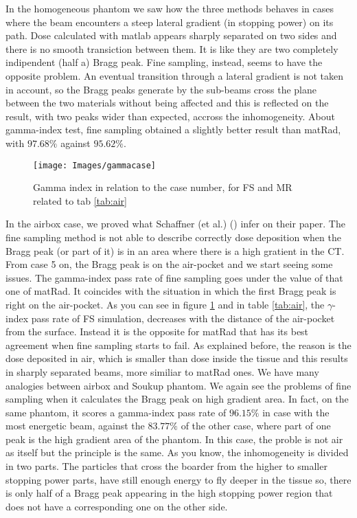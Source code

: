 \documentclass[12pt, a4paper, twoside]{book}
\begin{document}
In the homogeneous phantom we saw how the three methods behaves in cases where the beam encounters a steep lateral gradient (in stopping power) on its path. Dose calculated with matlab appears sharply separated on two sides and there is no smooth transiction between them. It is like they are two completely indipendent (half a) Bragg peak.
Fine sampling, instead, seems to have the opposite problem. An eventual transition through a lateral gradient is not taken in account, so the Bragg peaks generate by the sub-beams cross the plane between the two materials without being affected and this is reflected on the result, with two peaks wider than expected, accross the inhomogeneity. About gamma-index test, fine sampling obtained a slightly better result than matRad, with $97.68\%$ against $95.62\%$.

\begin{figure}[!t]
\centering
{\texttt{[image: Images/gammacase]}} 
\caption{Gamma index in relation to the case number, for FS and MR related to tab \ref{tab:air}}
\label{fig:gamcase}
\end{figure}

In the airbox case, we proved what Schaffner (et al.) (\cite{schaf:pba}) infer on their paper. The fine sampling method is not able to describe correctly dose deposition when the Bragg peak (or part of it) is in an area where there is a high gratient in the CT. From case 5 on, the Bragg peak is on the air-pocket and we start seeing some issues. The gamma-index pass rate of fine sampling goes under the value of that one of matRad. It coincides with the situation in which the first Bragg peak is right on the air-pocket. As you can see in figure \ref{fig:gamcase} and in table \ref{tab:air}, the $\gamma$-index pass rate of FS simulation, decreases with the distance of the air-pocket from the surface. Instead it is the opposite for matRad that has its best agreement when fine sampling starts to fail. As explained before, the reason is the dose deposited in air, which is smaller than dose inside the tissue and this results in sharply separated beams, more similiar to matRad ones. We have many analogies between airbox and Soukup phantom. We again see the problems of fine sampling when it calculates the Bragg peak on high gradient area. In fact, on the same phantom, it scores a gamma-index pass rate of $96.15\%$ in case with the most energetic beam, against the $83.77\%$ of the other case, where part of one peak is the high gradient area of the phantom. In this case, the proble is not air as itself but the principle is the same.
As you know, the inhomogeneity is divided in two parts. The particles that cross the boarder from the higher to smaller stopping power parts, have still enough energy to fly deeper in the tissue so, there is only half of a Bragg peak appearing in the high stopping power region that does not have a corresponding one on the other side.
\end{document}
